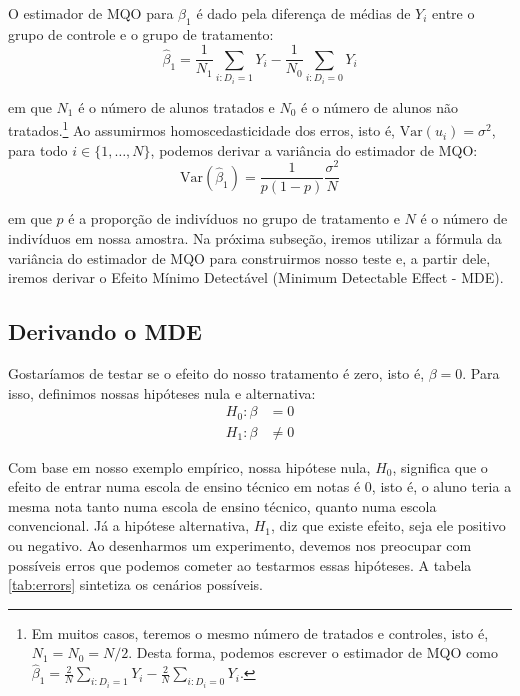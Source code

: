 O estimador de MQO para $\beta_1$ é dado pela diferença de médias de $Y_i$ entre o grupo de controle e o grupo de tratamento:
\begin{equation}
    \hat{\beta}_1 = \frac{1}{N_1}\sum_{i:D_i = 1} Y_i - \frac{1}{N_0}\sum_{i:D_i = 0} Y_i
\end{equation}

\noindent em que $N_1$ é o número de alunos tratados e 
$N_0$ é o número de alunos não tratados.\footnote{Em muitos casos, teremos o mesmo número de tratados e controles, isto é, $N_1 = N_0 = N/2$. Desta forma, podemos escrever o estimador de MQO como $\hat{\beta}_1 = \frac{2}{N}\sum_{i:D_i = 1} Y_i - \frac{2}{N}\sum_{i:D_i = 0} Y_i$.} Ao assumirmos homoscedasticidade dos erros, isto é, $\mathrm{Var}(u_i) = \sigma^2$, para todo $i \in \{1,\dots,N\}$, podemos derivar a variância do estimador de MQO:
\begin{equation}\label{varbeta}
    \mathrm{Var}(\hat{\beta}_1) = \frac{1}{p(1-p)}\frac{\sigma^2}{N} 
\end{equation}

\noindent em que $p$ é a proporção de indivíduos no grupo de tratamento e $N$ é o número de indivíduos em nossa amostra. Na próxima subseção, iremos utilizar a fórmula da variância do estimador de MQO para construirmos nosso teste e, a partir dele, iremos derivar o Efeito Mínimo Detectável (Minimum Detectable Effect - MDE).


\subsection{\sc Derivando o MDE}

Gostaríamos de testar se o efeito do nosso tratamento é zero, isto é, $\beta = 0$. Para isso, definimos nossas hipóteses nula e alternativa:
\begin{align*}
        H_0: \beta & = 0\\
        H_1: \beta & \neq 0
    \end{align*}

Com base em nosso exemplo empírico, nossa hipótese nula, $H_0$, significa que o efeito de entrar numa escola de ensino técnico em notas é 0, isto é, o aluno teria a mesma nota tanto numa escola de ensino técnico, quanto numa escola convencional. Já a hipótese alternativa, $H_1$, diz que existe efeito, seja ele positivo ou negativo. Ao desenharmos um experimento, devemos nos preocupar com possíveis erros que podemos cometer ao testarmos essas hipóteses. A tabela \ref{tab:errors} sintetiza os cenários possíveis. 

